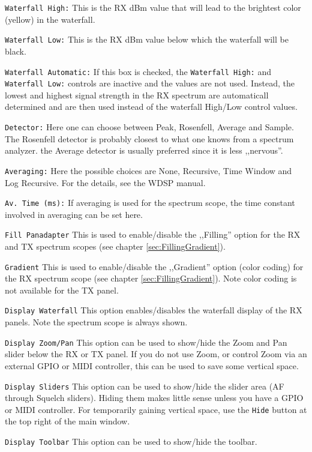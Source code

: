 \documentclass[12pt]{book}
\def\rett#1{\texttt{\color{red}#1}}
\begin{document}
\rett{Waterfall High:} This is the RX dBm value that will lead to the brightest
color (yellow) in the waterfall.

\rett{Waterfall Low:} This is the RX dBm value below which the waterfall will be black.

\rett{Waterfall Automatic:} If this box is checked, the \rett{Waterfall High:} and
\rett{Waterfall Low:} controls are inactive and the values are not used. Instead, 
the lowest and highest signal strength in the RX spectrum are automaticall determined
and are then used instead of the waterfall High/Low control values.

\rett{Detector:} Here one can choose between Peak, Rosenfell, Average and Sample. The
Rosenfell detector is probably closest to what one knows from a spectrum analyzer.
the Average detector is usually preferred since it is less ,,nervous''.

\rett{Averaging:} Here the possible choices are None, Recursive, Time Window and
Log Recursive. For the details, see the WDSP manual.

\rett{Av. Time (ms):} If averaging is used for the spectrum scope, the time 
constant involved in averaging can be set here.

\rett{Fill Panadapter} This is used to enable/disable the ,,Filling'' option
for the RX and TX spectrum scopes (see chapter \ref{sec:FillingGradient}).

\rett{Gradient} This is used to enable/disable the ,,Gradient'' option
(color coding) for the RX spectrum scope (see chapter \ref{sec:FillingGradient}).
 Note color coding is not available for the TX panel.
 
 \rett{Display Waterfall} This option enables/disables the waterfall display
 of the RX panels. Note the spectrum scope is always shown.
 
 \rett{Display Zoom/Pan} This option can be used to show/hide the Zoom and
 Pan slider below the RX or TX panel. If you do not use Zoom, or control
 Zoom via an external GPIO or MIDI controller, this can be used to save
 some vertical space.
 
 \rett{Display Sliders} This option can be used to show/hide the slider area
 (AF through Squelch sliders). Hiding them makes little sense unless you
 have a GPIO or MIDI controller. For temporarily gaining vertical space,
 use the \rett{Hide} button at the top right of the main window.
 
 \rett{Display Toolbar} This option can be used to show/hide the toolbar.
\end{document}

